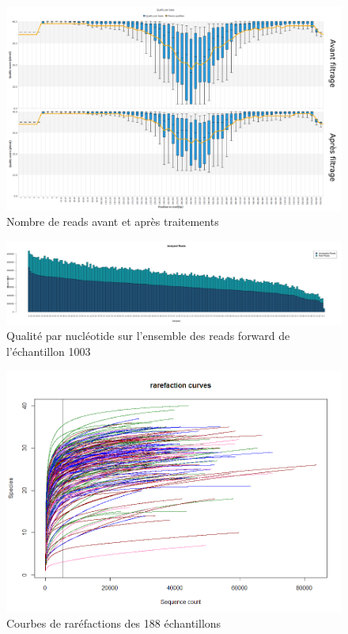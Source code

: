 \documentclass[12pt,a4paper]{article}
\begin{document}
\begin{figure}[!ht]
\begin{center}
\includegraphics[scale=0.45]{img/duo_merging.png}\hfill
\end{center}
\caption{Nombre de reads avant et après traitements}
\label{fastqc merging}
\end{figure}

\begin{figure}[!ht]
\begin{center}
\includegraphics[scale=0.25]{img/pipeline.png}\hfill
\end{center}
\caption{Qualité par nucléotide sur l'ensemble des reads forward de l'échantillon 1003}
\label{all}
\end{figure}

\newpage



\begin{figure}[!ht]
\begin{center}
\includegraphics[scale=0.5]{img/rarefaction.png}\hfill
\end{center}
\caption{Courbes de raréfactions des 188 échantillons}
\label{rarefaction}
\end{figure}
\end{document}
